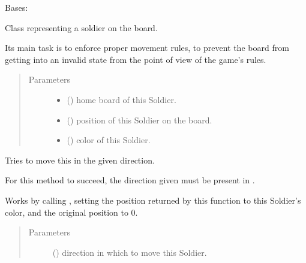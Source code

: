 \documentclass[letterpaper,10pt,english]{sphinxmanual}
\begin{document}
\begin{fulllineitems}
\label{\detokenize{neutron:neutron.Soldier}}
Bases: 

Class representing a soldier on the board.

Its main task is to enforce proper movement rules, to prevent the board
from getting into an invalid state from the point of view of the game’s
rules.
\begin{quote}\begin{description}
\item[{Parameters}] \leavevmode\begin{itemize}
\item {} 
 ({\hyperref[\detokenize{neutron:neutron.NeutronBoard}]{}}) \textendash{} home board of this Soldier.

\item {} 
 ({\hyperref[\detokenize{util:util.Vec}]{}}) \textendash{} position of this Soldier on the board.

\item {} 
 () \textendash{} color of this Soldier.

\end{itemize}

\end{description}\end{quote}

\begin{fulllineitems}
\label{\detokenize{neutron:neutron.Soldier.move}}
Tries to move this  in the given direction.

For this method to succeed, the direction given must be present in
.

Works by calling {\hyperref[\detokenize{neutron:neutron.NeutronBoard.furthest_empty_spot}]{}}, setting
the position returned by this function to this Soldier’s color,
and the original position to 0.
\begin{quote}\begin{description}
\item[{Parameters}] \leavevmode
{} () \textendash{} direction in which to move this Soldier.


\end{description}
\end{quote}
\end{fulllineitems}
\end{fulllineitems}
\end{document}
